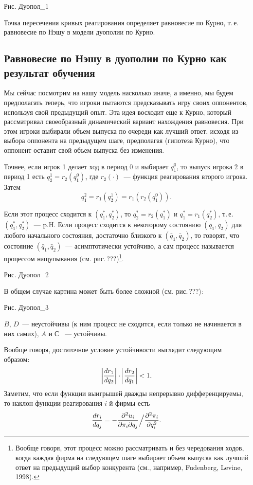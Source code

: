 \documentclass[12pt]{article}
\begin{document}
{Рис. Дуопол_1


Точка пересечения кривых реагирования определяет равновесие по
Курно, т.\,е.  равновесие по Нэшу в модели дуополии по Курно.

\subsection{Равновесие по Нэшу в дуополии по Курно как результат обучения}

Мы сейчас посмотрим на нашу модель насколько иначе, а именно, мы
будем предполагать теперь, что игроки пытаются предсказывать игру
своих оппонентов, используя свой предыдущий опыт. Эта идея восходит
еще к Курно, который рассматривал своеобразный динамический вариант
нахождения равновесия. При этом игроки выбирали объем выпуска по
очереди как лучший ответ,  исходя из выбора оппонента на предыдущем
шаге, предполагая (гипотеза Курно), что  оппонент оставит свой объем
выпуска без изменения.

Точнее, если игрок 1 делает ход в период $0$ и выбирает $q^0_1$, то
выпуск игрока 2 в период 1 есть $q^1_2=r_2(q^0_1)$, где
$r_2(\cdot)$~--- функция реагирования второго игрока. Затем
$$
q^2_1=r_1(q^1_2)=r_1(r_2(q^0_1)).
$$

Если этот процесс сходится к $(q^*_1,q^*_2)$, то $q^*_2=r_2(q^*_1)$
и $q^*_1=r_1(q^*_2)$, т.\,е. $(q^*_1,q^*_2)$~--- p.H. Если процесс
сходится к некоторому состоянию $(\bar q_1,\bar q_2)$ для любого
начального состояния, достаточно близкого к $(\bar q_1,\bar q_2)$,
то говорят, что
состояние $(\bar q_1,\bar q_2)$~--- асимптотически устойчиво, а сам
процесс называется процессом нащупывания (см. рис.\,???)\footnote{
Вообще говоря, этот процесс можно рассматривать и без чередования
ходов, когда каждая фирма на следующем шаге выбирает объем выпуска
как лучший ответ на предыдущий выбор конкурента (см., например,
Fudenberg, Levine, 1998).}.


Рис. Дуопол_2


В общем случае картина может быть более сложной (см. рис.\,???):

Рис. Дуопол_3

$B$, $D$~--- неустойчивы  (к ним процесс не сходится, если
только не начинается   в них самих), $A$ и $С$ ~--- устойчивы.

Вообще говоря, достаточное условие устойчивости выглядит следующим
образом:
$$
\biggl |{dr_1\over dq_2}\biggr |\cdot\biggl |{dr_2\over dq_1}\biggr
|<1.
$$
Заметим, что если функции выигрышей дважды непрерывно
дифференцируемы, то наклон функции реагирования $i$-й фирмы есть
$$
{dr_i\over dq_j}=-{\partial^2 u_i\over{\partial\pi_i\partial
q_j}}\Big /{{\partial^2\pi_i}\over{\partial q^2_i}}.
$$

}
\end{document}

